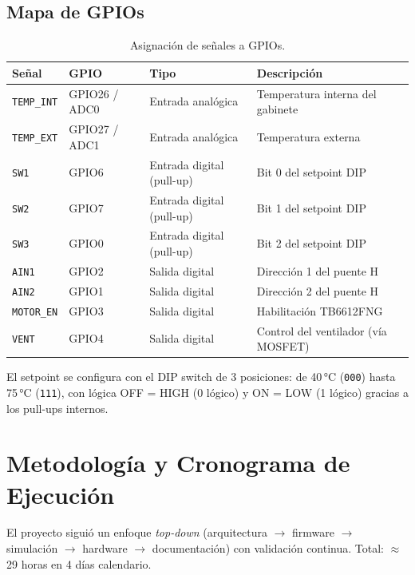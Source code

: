 \documentclass[11pt,letterpaper]{article}
\begin{document}
\subsection{Mapa de GPIOs}
\begin{table}[H]
\centering\small
{}
\begin{tabular}{l l l l}
\toprule
\rowcolor{JagDark}\color{white}\textbf{Señal} & \color{white}\textbf{GPIO} & \color{white}\textbf{Tipo} & \color{white}\textbf{Descripción} \\
\midrule
\texttt{TEMP\_INT} & GPIO26 / ADC0 & Entrada analógica & Temperatura interna del gabinete \\
\texttt{TEMP\_EXT} & GPIO27 / ADC1 & Entrada analógica & Temperatura externa \\
\texttt{SW1} & GPIO6 & Entrada digital (pull-up) & Bit 0 del setpoint DIP \\
\texttt{SW2} & GPIO7 & Entrada digital (pull-up) & Bit 1 del setpoint DIP \\
\texttt{SW3} & GPIO0 & Entrada digital (pull-up) & Bit 2 del setpoint DIP \\
\texttt{AIN1} & GPIO2 & Salida digital & Dirección 1 del puente H \\
\texttt{AIN2} & GPIO1 & Salida digital & Dirección 2 del puente H \\
\texttt{MOTOR\_EN} & GPIO3 & Salida digital & Habilitación TB6612FNG \\
\texttt{VENT} & GPIO4 & Salida digital & Control del ventilador (vía MOSFET) \\
\bottomrule
\end{tabular}
\caption{Asignación de señales a GPIOs.}
\end{table}

El setpoint se configura con el DIP switch de 3 posiciones: de 40\,°C (\texttt{000})
hasta 75\,°C (\texttt{111}), con lógica OFF = HIGH (0 lógico) y ON = LOW (1 lógico)
gracias a los pull-ups internos.

\section{Metodología y Cronograma de Ejecución}
El proyecto siguió un enfoque \emph{top-down} (arquitectura $\rightarrow$ firmware
$\rightarrow$ simulación $\rightarrow$ hardware $\rightarrow$ documentación) con
validación continua. Total: $\approx$29 horas en 4 días calendario.
\end{document}
